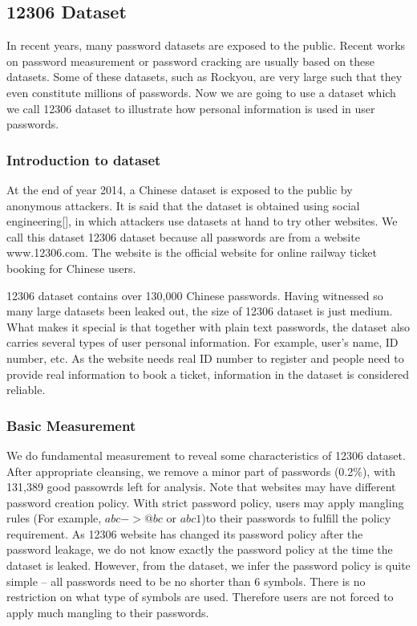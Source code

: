\documentclass{sig-alternate}
\begin{document}
\subsection{12306 Dataset}
In recent years, many password datasets are exposed to the public. Recent works on password measurement or password cracking are usually based on these datasets. Some of these datasets, such as Rockyou, are very large such that they even constitute millions of passwords. Now we are going to use a dataset which we call 12306 dataset to illustrate how personal information is used in user passwords.
\subsubsection{Introduction to dataset}
At the end of year 2014, a Chinese dataset is exposed to the public by anonymous attackers. It is said that the dataset is obtained using social engineering[], in which attackers use datasets at hand to try other websites. We call this dataset 12306 dataset because all passwords are from a website www.12306.com. The website is the official website for online railway ticket booking for Chinese users.

12306 dataset contains over 130,000 Chinese passwords. Having witnessed so many large datasets been leaked out, the size of 12306 dataset is just medium. What makes it special is that together with plain text passwords, the dataset also carries several types of user personal information. For example, user's name, ID number, etc. As the website needs real ID number to register and people need to provide real information to book a ticket, information in the dataset is considered reliable.

\subsubsection{Basic Measurement}
We do fundamental measurement to reveal some characteristics of 12306 dataset. After appropriate cleansing, we remove a minor part of passwords (0.2\%), with 131,389 good passowrds left for analysis. Note that websites may have different password creation policy. With strict password policy, users may apply mangling rules (For example, $abc -> @bc$ or $abc1$)to their passwords to fulfill the policy requirement. As 12306 website has changed its password policy after the password leakage, we do not know exactly the password policy at the time the dataset is leaked. However, from the dataset, we infer the password policy is quite simple -- all passwords need to be no shorter than 6 symbols. There is no restriction on what type of symbols are used. Therefore users are not forced to apply much mangling to their passwords. 
\end{document}
